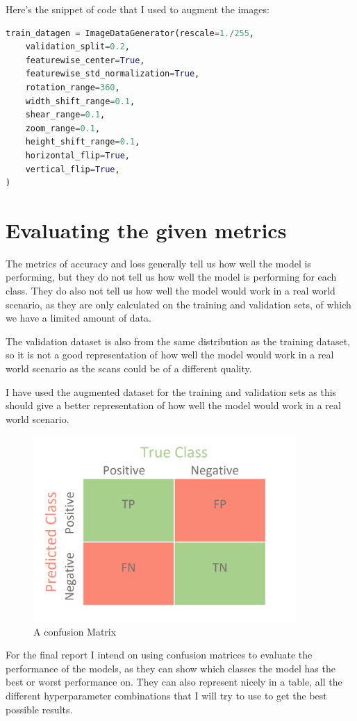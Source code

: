 \documentclass[]{final_report}
\begin{document}
Here's the snippet of code that I used to augment the images:
\begin{lstlisting}[language=Python]
train_datagen = ImageDataGenerator(rescale=1./255,
    validation_split=0.2,
    featurewise_center=True,
    featurewise_std_normalization=True,
    rotation_range=360,
    width_shift_range=0.1,
    shear_range=0.1,
    zoom_range=0.1,
    height_shift_range=0.1,
    horizontal_flip=True,
    vertical_flip=True,
)
\end{lstlisting}

\pagebreak

\section{Evaluating the given metrics}
The metrics of accuracy and loss generally tell us how well the model is performing,
but they do not tell us how well the model is performing for each class.
They do also not tell us how well the model would work in a real world scenario, 
as they are only calculated on the training and validation sets, of which we have a limited amount of data.

The validation dataset is also from the same distribution as the training dataset, 
so it is not a good representation of how well the model would work in a real world scenario 
as the scans could be of a different quality.

I have used the augmented dataset for the training and validation sets as this 
should give a better representation of how well the model would work in a real world scenario.

\begin{figure}[ht!]
  \centering
  \includegraphics[width=100mm]{images/ConfusionMatrix.png}
  \caption{A confusion Matrix\cite{ConfusionMatrix}}
\end{figure}
For the final report I intend on using confusion matrices to evaluate the performance of the models,
as they can show which classes the model has the best or worst performance on.
They can also represent nicely in a table, all the different hyperparameter combinations that I will try
to use to get the best possible results.
\end{document}
